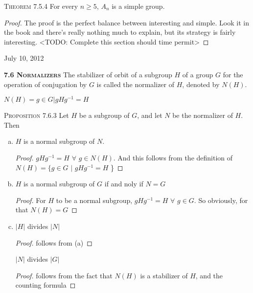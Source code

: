 \documentclass[12pt]{article}
\begin{document}
\textsc {Theorem 7.5.4 } For every $n \geq 5$, $A_{n}$ is a simple group.
\par
\begin{proof}
The proof is the perfect balance between interesting and simple. Look it in the book and there's really nothing much to explain, but its strategy is fairly interesting. <TODO: Complete this section should time permit>
\end{proof}
\begin{flushright} {\small July 10, 2012} \end{flushright}
\textbf {\textsc {7.6 Normalizers }} The stabilizer of orbit of a subgroup $H$ of a group $G$ for the operation of conjugation by $G$ is called the normalizer of $H$, denoted by $N(H)$.
\par
$N(H) = {g\in G | gHg^{-1} = H}$
\par
\textsc {Proposition 7.6.3 } Let $H$ be a subgroup of $G$, and let $N$ be the normalizer of $H$. Then
\begin{enumerate}[(a)]
\item $H$ is a normal subgroup of $N$.
\begin{proof} $gHg^{-1}=H\,\, \forall \,\,g \in N(H)$. And this follows from the definition of $ N(H) = \{ g \in G \,\,|\,\, gHg^{-1}=H $ \}
\end{proof}
\item $H$ is a normal subgroup of $G$ if and noly if $N=G$
\begin{proof} For $H$ to be a normal subgroup, $gHg^{-1}=H\,\, \forall \,\,g \in G$. So obviously, for that $N(H)=G$
\end{proof}
\item $|H|$ divides $|N|$
\begin{proof}follows from (a)\end{proof}
$|N|$ divides $|G|$
\begin{proof}follows from the fact that $N(H)$ is a stabilizer of $H$, and the counting formula\end{proof}
\end{enumerate}
\end{document}
